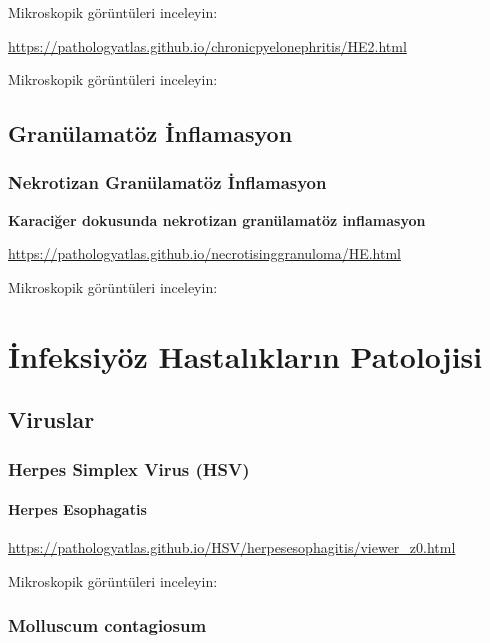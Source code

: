 \documentclass[
  letterpaper,
  DIV=11,
  numbers=noendperiod]{scrreprt}
\begin{document}
Mikroskopik görüntüleri inceleyin:

\url{https://pathologyatlas.github.io/chronicpyelonephritis/HE2.html}

Mikroskopik görüntüleri inceleyin:

\hypertarget{granuxfclamatuxf6z-inflamasyon}{%
\chapter{Granülamatöz
İnflamasyon}\label{granuxfclamatuxf6z-inflamasyon}}

\hypertarget{nekrotizan-granuxfclamatuxf6z-inflamasyon}{%
\section{Nekrotizan Granülamatöz
İnflamasyon}\label{nekrotizan-granuxfclamatuxf6z-inflamasyon}}

\textbf{Karaciğer dokusunda nekrotizan granülamatöz inflamasyon}

\url{https://pathologyatlas.github.io/necrotisinggranuloma/HE.html}

Mikroskopik görüntüleri inceleyin:

\part{İnfeksiyöz Hastalıkların Patolojisi}

\hypertarget{viruslar}{%
\chapter{Viruslar}\label{viruslar}}

\hypertarget{herpes-simplex-virus-hsv}{%
\section{Herpes Simplex Virus (HSV)}\label{herpes-simplex-virus-hsv}}

\hypertarget{herpes-esophagatis}{%
\subsection{Herpes Esophagatis}\label{herpes-esophagatis}}

\url{https://pathologyatlas.github.io/HSV/herpesesophagitis/viewer_z0.html}

Mikroskopik görüntüleri inceleyin:

\hypertarget{molluscum-contagiosum}{%
\section{Molluscum contagiosum}\label{molluscum-contagiosum}}
\end{document}
